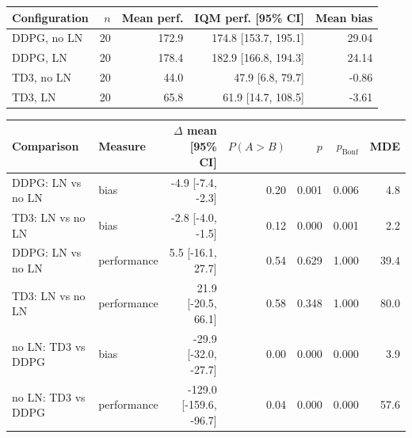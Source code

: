 \begin{tabular}{lrrrr}
\toprule
Configuration & $n$ & Mean perf. & IQM perf. [95\% CI] & Mean bias \\
\midrule
DDPG, no LN & 20 & 172.9 & 174.8 [153.7, 195.1] & 29.04 \\
DDPG, LN & 20 & 178.4 & 182.9 [166.8, 194.3] & 24.14 \\
TD3, no LN & 20 & 44.0 & 47.9 [6.8, 79.7] & -0.86 \\
TD3, LN & 20 & 65.8 & 61.9 [14.7, 108.5] & -3.61 \\
\bottomrule
\end{tabular}

\begin{tabular}{llrrrrr}
\toprule
Comparison & Measure & $\Delta$ mean [95\% CI] & $P(A>B)$ & $p$ & $p_\mathrm{Bonf}$ & MDE \\
\midrule
DDPG: LN vs no LN & bias & -4.9 [-7.4, -2.3] & 0.20 & 0.001 & 0.006 & 4.8 \\
TD3: LN vs no LN & bias & -2.8 [-4.0, -1.5] & 0.12 & 0.000 & 0.001 & 2.2 \\
DDPG: LN vs no LN & performance & 5.5 [-16.1, 27.7] & 0.54 & 0.629 & 1.000 & 39.4 \\
TD3: LN vs no LN & performance & 21.9 [-20.5, 66.1] & 0.58 & 0.348 & 1.000 & 80.0 \\
no LN: TD3 vs DDPG & bias & -29.9 [-32.0, -27.7] & 0.00 & 0.000 & 0.000 & 3.9 \\
no LN: TD3 vs DDPG & performance & -129.0 [-159.6, -96.7] & 0.04 & 0.000 & 0.000 & 57.6 \\
\bottomrule
\end{tabular}
